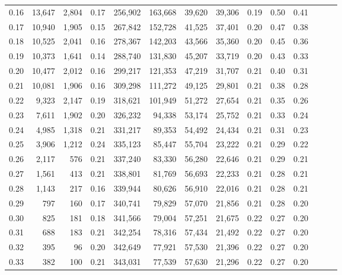 \begin{tabular}{rrrrrrrrrrrrrr}
0.16 &  13,647 &  2,804 &  0.17 &  256,902 &  163,668 &  39,620 &  39,306 &  0.19 &  0.50 &      0.41 \\
0.17 &  10,940 &  1,905 &  0.15 &  267,842 &  152,728 &  41,525 &  37,401 &  0.20 &  0.47 &      0.38 \\
0.18 &  10,525 &  2,041 &  0.16 &  278,367 &  142,203 &  43,566 &  35,360 &  0.20 &  0.45 &      0.36 \\
0.19 &  10,373 &  1,641 &  0.14 &  288,740 &  131,830 &  45,207 &  33,719 &  0.20 &  0.43 &      0.33 \\
0.20 &  10,477 &  2,012 &  0.16 &  299,217 &  121,353 &  47,219 &  31,707 &  0.21 &  0.40 &      0.31 \\
0.21 &  10,081 &  1,906 &  0.16 &  309,298 &  111,272 &  49,125 &  29,801 &  0.21 &  0.38 &      0.28 \\
0.22 &   9,323 &  2,147 &  0.19 &  318,621 &  101,949 &  51,272 &  27,654 &  0.21 &  0.35 &      0.26 \\
0.23 &   7,611 &  1,902 &  0.20 &  326,232 &   94,338 &  53,174 &  25,752 &  0.21 &  0.33 &      0.24 \\
0.24 &   4,985 &  1,318 &  0.21 &  331,217 &   89,353 &  54,492 &  24,434 &  0.21 &  0.31 &      0.23 \\
0.25 &   3,906 &  1,212 &  0.24 &  335,123 &   85,447 &  55,704 &  23,222 &  0.21 &  0.29 &      0.22 \\
0.26 &   2,117 &    576 &  0.21 &  337,240 &   83,330 &  56,280 &  22,646 &  0.21 &  0.29 &      0.21 \\
0.27 &   1,561 &    413 &  0.21 &  338,801 &   81,769 &  56,693 &  22,233 &  0.21 &  0.28 &      0.21 \\
0.28 &   1,143 &    217 &  0.16 &  339,944 &   80,626 &  56,910 &  22,016 &  0.21 &  0.28 &      0.21 \\
0.29 &     797 &    160 &  0.17 &  340,741 &   79,829 &  57,070 &  21,856 &  0.21 &  0.28 &      0.20 \\
0.30 &     825 &    181 &  0.18 &  341,566 &   79,004 &  57,251 &  21,675 &  0.22 &  0.27 &      0.20 \\
0.31 &     688 &    183 &  0.21 &  342,254 &   78,316 &  57,434 &  21,492 &  0.22 &  0.27 &      0.20 \\
0.32 &     395 &     96 &  0.20 &  342,649 &   77,921 &  57,530 &  21,396 &  0.22 &  0.27 &      0.20 \\
0.33 &     382 &    100 &  0.21 &  343,031 &   77,539 &  57,630 &  21,296 &  0.22 &  0.27 &      0.20 \\

\end{tabular}
